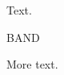 \documentclass[twocolumn]{article}
\begin{document}
Text.
\begin{wideband}\centering BAND\end{wideband}
More text.
\end{document}
